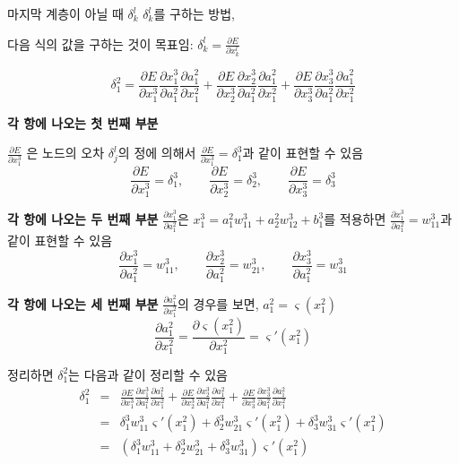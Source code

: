 \documentclass[10pt,t]{beamer}
\begin{document}
\begin{frame} {마지막 계층이 아닐 때 $\delta _k^l$}
   $\delta_k^l$를 구하는 방법,
   
   다음 식의 값을 구하는 것이 목표임: $\delta_k^l = \frac{\partial E}{\partial x_k^l}$

   \[\delta_1^2 = \frac{\partial E}{\partial x_1^3}\frac{\partial x_1^3}{\partial a_1^2}\frac{\partial a_1^2}{\partial x_1^2} + \frac{\partial E}{\partial x_2^3}\frac{\partial x_2^3}{\partial a_1^2}\frac{\partial a_1^2}{\partial x_1^2}  + \frac{\partial E}{\partial x_3^3}\frac{\partial x_3^3}{\partial a_1^2}\frac{\partial a_1^2}{\partial x_1^2}\]

   
   \textbf{각 항에 나오는 첫 번째 부분}
   
   $\frac{\partial E}{\partial x_1^3}$ 은 노드의 오차 $\delta_j^l$의 정에 의해서 $\frac{\partial E}{\partial x_1^3} = \delta _1^3$과 같이 표현할 수 있음
   \[\frac{\partial E}{\partial x_1^3} = \delta _1^3, \qquad \frac{\partial E}{\partial x_2^3} = \delta _2^3, \qquad \frac{\partial E}{\partial x_3^3} = \delta _3^3 \]
   \pagebreak

   \textbf{각 항에 나오는 두 번째 부분}
    $\frac{\partial x_1^3}{\partial a_1^2}$은 $x_1^3 = a_1^2 w_{11}^3 +  a_2^2 w_{12}^3 + b_1^3$를 적용하면 $\frac{\partial x_1^3}{\partial a_1^2} = w_{11}^3$과 같이 표현할 수 있음
    \[\frac{\partial x_1^3}{\partial a_1^2} = w_{11}^3, \qquad \frac{\partial x_2^3}{\partial a_1^2} = w_{21}^3, \qquad \frac{\partial x_3^3}{\partial a_1^2} = w_{31}^3 \]

    \textbf{각 항에 나오는 세 번째 부분}
    $\frac{\partial a_1^2}{\partial x_1^2}$의 경우를 보면, $a_1^2 = \varsigma(x_1^2)$
    \[\frac{\partial a_1^2}{\partial x_1^2} = \frac{\partial \varsigma(x_1^2)}{\partial x_1^2} = \varsigma' (x_1^2)\]

    \pagebreak

    정리하면 $\delta_1^2$는 다음과 같이 정리할 수 있음
    \begin{eqnarray*}
        \delta_1^2 &=& \frac{\partial E}{\partial x_1^3}\frac{\partial x_1^3}{\partial a_1^2}\frac{\partial a_1^2}{\partial x_1^2} + \frac{\partial E}{\partial x_2^3}\frac{\partial x_2^3}{\partial a_1^2}\frac{\partial a_1^2}{\partial x_1^2}  + \frac{\partial E}{\partial x_3^3}\frac{\partial x_3^3}{\partial a_1^2}\frac{\partial a_1^2}{\partial x_1^2} \\
        &=& \delta_1^3 w_{11}^3 \varsigma' (x_1^2) + \delta_2^3 w_{21}^3 \varsigma' (x_1^2) + \delta_3^3 w_{31}^3 \varsigma' (x_1^2) \\
        &=& (\delta_1^3 w_{11}^3  + \delta_2^3 w_{21}^3  + \delta_3^3 w_{31}^3 )\varsigma' (x_1^2)
    \end{eqnarray*}


\end{frame}
\end{document}

